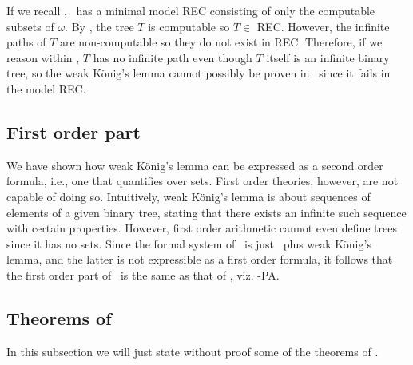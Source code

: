 \documentclass[../main.tex]{memoir}
\begin{document}
If we recall , \rca\ has a minimal model REC consisting of only the computable subsets of $\omega$. By , the tree $T$ is computable so $T \in$ REC. However, the infinite paths of $T$ are non-computable so they do not exist in REC. Therefore, if we reason within \rca, $T$ has no infinite path even though $T$ itself is an infinite binary tree, so the weak König's lemma cannot possibly be proven in \rca\ since it fails in the model REC.

\subsection{First order part}

We have shown how weak König's lemma can be expressed as a second order formula, i.e., one that quantifies over sets. First order theories, however, are not capable of doing so. Intuitively, weak König's lemma is about sequences of elements of a given binary tree, stating that there exists an infinite such sequence with certain properties. However, first order arithmetic cannot even define trees since it has no sets. Since the formal system of \wkl\ is just \rca\ plus weak König's lemma, and the latter is not expressible as a first order formula, it follows that the first order part of \wkl\ is the same as that of \rca, viz. \re-PA.

\subsection{Theorems of \wkl}

In this subsection we will just state without proof some of the theorems of \wkl.
\end{document}
